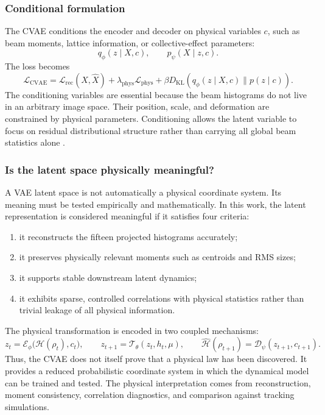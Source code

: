 \documentclass[11pt,a4paper]{article}
\providecommand{\KL}{D_{\mathrm{KL}}}
\begin{document}
\begin{sloppypar}
\subsubsection{Conditional formulation}
The CVAE conditions the encoder and decoder on physical variables $c$, such as beam moments, lattice information, or collective-effect parameters:
\begin{equation}
    q_{\phi}(z\mid X,c),\qquad p_{\psi}(X\mid z,c).
\end{equation}
The loss becomes
\begin{equation}
    \mathcal{L}_{\mathrm{CVAE}}
    =
    \mathcal{L}_{\mathrm{rec}}(X,\widehat{X})
    +
    \lambda_{\mathrm{phys}}\mathcal{L}_{\mathrm{phys}}
    +
    \beta\KL\left(q_{\phi}(z\mid X,c)\|p(z\mid c)\right).
    \label{eq:cvae_loss_v2}
\end{equation}
The conditioning variables are essential because the beam histograms do not live in an arbitrary image space. Their position, scale, and deformation are constrained by physical parameters. Conditioning allows the latent variable to focus on residual distributional structure rather than carrying all global beam statistics alone \cite{sohn_cvae_2015}.

\subsubsection{Is the latent space physically meaningful?}
A VAE latent space is not automatically a physical coordinate system. Its meaning must be tested empirically and mathematically. In this work, the latent representation is considered meaningful if it satisfies four criteria:
\begin{enumerate}[label=(\roman*)]
    \item it reconstructs the fifteen projected histograms accurately;
    \item it preserves physically relevant moments such as centroids and RMS sizes;
    \item it supports stable downstream latent dynamics;
    \item it exhibits sparse, controlled correlations with physical statistics rather than trivial leakage of all physical information.
\end{enumerate}

The physical transformation is encoded in two coupled mechanisms:
\begin{equation}
    z_t=\mathcal{E}_{\phi}\big(\mathcal{H}(\rho_t),c_t\big),
    \qquad
    z_{t+1}=\mathcal{T}_{\theta}(z_t,h_t,\mu),
    \qquad
    \widehat{\mathcal{H}}(\rho_{t+1})=\mathcal{D}_{\psi}(z_{t+1},c_{t+1}).
    \label{eq:latent_physical_transformation}
\end{equation}
Thus, the CVAE does not itself prove that a physical law has been discovered. It provides a reduced probabilistic coordinate system in which the dynamical model can be trained and tested. The physical interpretation comes from reconstruction, moment consistency, correlation diagnostics, and comparison against tracking simulations.


\end{sloppypar}
\end{document}
